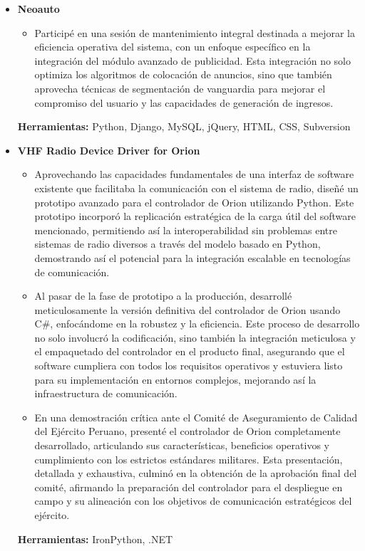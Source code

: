 \documentclass[11pt,a4paper,english]{moderncv}
\begin{document}
{
\begin{itemize}
    \item \textbf{Neoauto}
        \begin{itemize}
            \item Participé en una sesión de mantenimiento integral destinada a mejorar la eficiencia operativa del sistema, con un enfoque específico en la integración del módulo avanzado de publicidad. Esta integración no solo optimiza los algoritmos de colocación de anuncios, sino que también aprovecha técnicas de segmentación de vanguardia para mejorar el compromiso del usuario y las capacidades de generación de ingresos.
        \end{itemize}
        \textbf{Herramientas:}  Python, Django, MySQL, jQuery, HTML, CSS, Subversion
    \item \textbf{VHF Radio Device Driver for Orion}
        \begin{itemize}
            \item Aprovechando las capacidades fundamentales de una interfaz de software existente que facilitaba la comunicación con el sistema de radio, diseñé un prototipo avanzado para el controlador de Orion utilizando Python. Este prototipo incorporó la replicación estratégica de la carga útil del software mencionado, permitiendo así la interoperabilidad sin problemas entre sistemas de radio diversos a través del modelo basado en Python, demostrando así el potencial para la integración escalable en tecnologías de comunicación.
            \item Al pasar de la fase de prototipo a la producción, desarrollé meticulosamente la versión definitiva del controlador de Orion usando C\#, enfocándome en la robustez y la eficiencia. Este proceso de desarrollo no solo involucró la codificación, sino también la integración meticulosa y el empaquetado del controlador en el producto final, asegurando que el software cumpliera con todos los requisitos operativos y estuviera listo para su implementación en entornos complejos, mejorando así la infraestructura de comunicación.
            \item En una demostración crítica ante el Comité de Aseguramiento de Calidad del Ejército Peruano, presenté el controlador de Orion completamente desarrollado, articulando sus características, beneficios operativos y cumplimiento con los estrictos estándares militares. Esta presentación, detallada y exhaustiva, culminó en la obtención de la aprobación final del comité, afirmando la preparación del controlador para el despliegue en campo y su alineación con los objetivos de comunicación estratégicos del ejército.
        \end{itemize}
        \textbf{Herramientas:} IronPython, .NET
\end{itemize}
}
\end{document}
